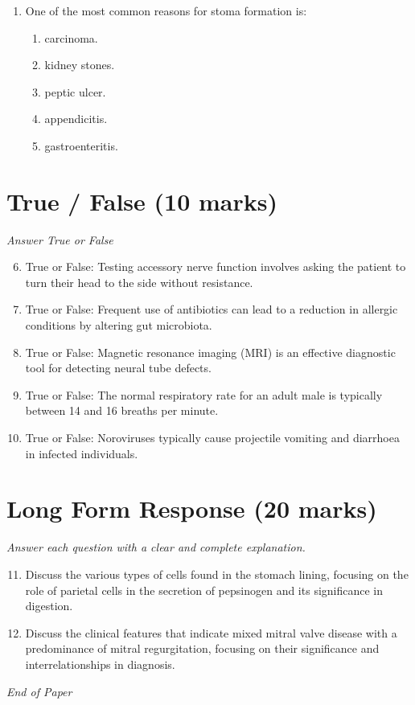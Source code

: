 \documentclass[12pt]{article}
\begin{document}
\begin{enumerate}[label=\arabic*.]
\begin{enumerate}[label=(\alph*)]
    \item Reptiles
    \item Birds
    \item Primates
    \item Humans
    \item Cattle
\end{enumerate}
\item One of the most common reasons for stoma formation is:
\begin{enumerate}[label=(\alph*)]
    \item carcinoma.
    \item kidney stones.
    \item peptic ulcer.
    \item appendicitis.
    \item gastroenteritis.
\end{enumerate}
\end{enumerate}

\section*{True / False (10 marks)}
\textit{Answer True or False}
\begin{enumerate}[label=\arabic*.]
\setcounter{enumi}{5}
\item True or False: Testing accessory nerve function involves asking the patient to turn their head to the side without resistance.
\item True or False: Frequent use of antibiotics can lead to a reduction in allergic conditions by altering gut microbiota.
\item True or False: Magnetic resonance imaging (MRI) is an effective diagnostic tool for detecting neural tube defects.
\item True or False: The normal respiratory rate for an adult male is typically between 14 and 16 breaths per minute.
\item True or False: Noroviruses typically cause projectile vomiting and diarrhoea in infected individuals.
\end{enumerate}

\section*{Long Form Response (20 marks)}
\textit{Answer each question with a clear and complete explanation.}
\begin{enumerate}[label=\arabic*.]
\setcounter{enumi}{10}
\item Discuss the various types of cells found in the stomach lining, focusing on the role of parietal cells in the secretion of pepsinogen and its significance in digestion.
\item Discuss the clinical features that indicate mixed mitral valve disease with a predominance of mitral regurgitation, focusing on their significance and interrelationships in diagnosis.
\end{enumerate}

\vfill
\noindent\textit{End of Paper}
\end{document}
